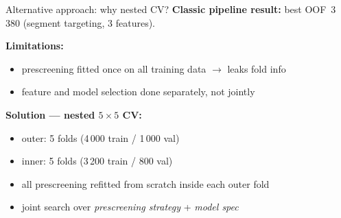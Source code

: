 \documentclass[aspectratio=169]{beamer}
\begin{document}
\begin{frame}{Alternative approach: why nested CV?}
    \textbf{Classic pipeline result:} best OOF~3\,380 (segment targeting, 3 features).

    \vspace{0.5em}
    \textbf{Limitations:}
    \begin{itemize}
        \item prescreening fitted once on all training data $\to$ leaks fold info
        \item feature and model selection done separately, not jointly
    \end{itemize}

    \vspace{0.5em}
    \textbf{Solution --- nested $5 \times 5$ CV:}
    \begin{itemize}
        \item outer: 5 folds (4\,000 train / 1\,000 val)
        \item inner: 5 folds (3\,200 train / 800 val)
        \item all prescreening refitted from scratch inside each outer fold
        \item joint search over \emph{prescreening strategy} + \emph{model spec}
    \end{itemize}
\end{frame}
\end{document}
